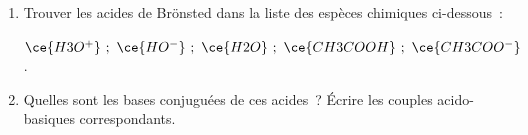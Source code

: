 \begin{enumerate}
    \item Trouver les acides de Brönsted dans la liste des espèces chimiques
          ci-dessous~:
    
          $\ce{H3O^+}~;\ \ce{HO^-}~;\ \ce{H2O}~;\ \ce{CH3COOH}~;\
          \ce{CH3COO^-}$.
    \item Quelles sont les bases conjuguées de ces acides~? Écrire les couples
          acido-basiques correspondants.
\end{enumerate}

